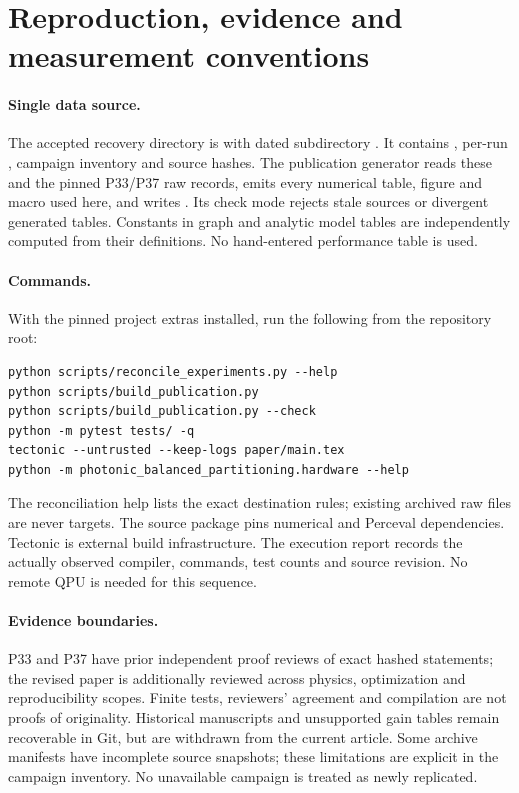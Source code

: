 \section{Reproduction, evidence and measurement conventions}\label{app:repro}
\paragraph{Single data source.}
The accepted recovery directory is  with dated subdirectory . It contains , per-run , campaign inventory and source hashes. The publication generator reads these and the pinned P33/P37 raw records, emits every numerical table, figure and macro used here, and writes . Its check mode rejects stale sources or divergent generated tables. Constants in graph and analytic model tables are independently computed from their definitions. No hand-entered performance table is used.

\paragraph{Commands.}
With the pinned project extras installed, run the following from the repository root:
\begin{verbatim}
python scripts/reconcile_experiments.py --help
python scripts/build_publication.py
python scripts/build_publication.py --check
python -m pytest tests/ -q
tectonic --untrusted --keep-logs paper/main.tex
python -m photonic_balanced_partitioning.hardware --help
\end{verbatim}
The reconciliation help lists the exact destination rules; existing archived raw files are never targets. The source package pins numerical and Perceval dependencies. Tectonic is external build infrastructure. The execution report records the actually observed compiler, commands, test counts and source revision. No remote QPU is needed for this sequence.

\paragraph{Evidence boundaries.}
P33 and P37 have prior independent proof reviews of exact hashed statements; the revised paper is additionally reviewed across physics, optimization and reproducibility scopes. Finite tests, reviewers' agreement and compilation are not proofs of originality. Historical manuscripts and unsupported gain tables remain recoverable in Git, but are withdrawn from the current article. Some archive manifests have incomplete source snapshots; these limitations are explicit in the campaign inventory. No unavailable campaign is treated as newly replicated.

